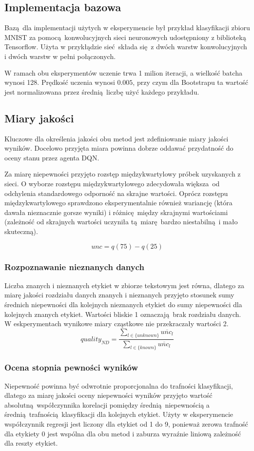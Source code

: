 \subsection{Implementacja bazowa}
Bazą dla implementacji użytych w eksperymencie był przykład klasyfikacji zbioru MNIST za pomocą konwolucyjnych sieci neuronowych udostępniony z biblioteką Tensorflow. Użyta w przykłądzie sieć składa się z dwóch warstw konwolucyjnych i dwóch warstw w pełni połączonych.

W ramach obu eksperymentów uczenie trwa 1 milion iteracji, a wielkość batcha wynosi 128. Prędkość uczenia wynosi $0.005$, przy czym dla Bootstrapu ta wartość jest normalizowana przez średnią liczbę użyć każdego przykładu.

\subsection{Miary jakości}
Kluczowe dla określenia jakości obu metod jest zdefiniowanie miary jakości wyników. Docelowo przyjęta miara powinna dobrze oddawać przydatność do oceny stanu przez agenta DQN.

Za miarę niepewności przyjęto rozstęp międzykwartylowy próbek uzyskanych z sieci. O wyborze rozstępu międzykwartylowego zdecydowała większa od odchylenia standardowego odporność na skrajne wartości. Oprócz rozstępu międzykwartylowego sprawdzono eksperymentalnie również wariancję (która dawała nieznacznie gorsze wyniki) i różnicę między skrajnymi wartościami (zależność od skrajnych wartości uczyniła tą miarę bardzo niestabilną i mało skuteczną).

\[ unc = q(75) -q(25)\]

\subsubsection{Rozpoznawanie nieznanych danych}
Liczba znanych i nieznanych etykiet w zbiorze tekstowym jest równa, dlatego za miarę jakości rozdziału danych znanych i nieznanych przyjęto stosunek sumy średnich niepewności dla kolejnych nieznanych etykiet do sumy niepewności dla kolejnych znanych etykiet. Wartości bliskie 1 oznaczają brak rozdziału danych. W eskperymentach wynikowe miary cząstkowe nie przekraczały wartości 2.
\[ quality_{ND} = \frac{\sum_{l \in \{unknown\}} \overline{unc_{l}}}{\sum_{l \in \{known\}} \overline{unc_{l}}}\]

\subsubsection{Ocena stopnia pewności wyników }
Niepewność powinna być odwrotnie proporcjonalna do trafności klasyfikacji, dlatego za miarę jakości oceny niepewności wyników przyjęto wartość absolutną współczynnika korelacji pomiędzy średnią niepewnością a średnią trafnością klasyfikacji dla kolejnych etykiet. Użyty w eksperymencie współczynnik regresji jest liczony dla etykiet od 1 do 9, ponieważ zerowa trafność dla etykiety 0 jest wspólna dla obu metod i zaburza wyraźnie liniową zależność dla reszty etykiet.


